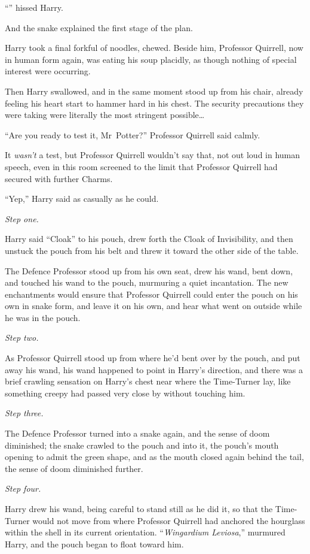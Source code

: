 “” hissed Harry.

And the snake explained the first stage of the plan.

\later

Harry took a final forkful of noodles, chewed. Beside him, Professor Quirrell, now in human form again, was eating his soup placidly, as though nothing of special interest were occurring.

Then Harry swallowed, and in the same moment stood up from his chair, already feeling his heart start to hammer hard in his chest. The security precautions they were taking were literally the most stringent possible…

“Are you ready to test it, Mr~Potter?” Professor Quirrell said calmly.

It \emph{wasn’t} a test, but Professor Quirrell wouldn’t say that, not out loud in human speech, even in this room screened to the limit that Professor Quirrell had secured with further Charms.

“Yep,” Harry said as casually as he could.

\emph{Step one.}

Harry said “Cloak” to his pouch, drew forth the Cloak of Invisibility, and then unstuck the pouch from his belt and threw it toward the other side of the table.

The Defence Professor stood up from his own seat, drew his wand, bent down, and touched his wand to the pouch, murmuring a quiet incantation. The new enchantments would ensure that Professor Quirrell could enter the pouch on his own in snake form, and leave it on his own, and hear what went on outside while he was in the pouch.

\emph{Step two.}

As Professor Quirrell stood up from where he’d bent over by the pouch, and put away his wand, his wand happened to point in Harry’s direction, and there was a brief crawling sensation on Harry’s chest near where the Time-Turner lay, like something creepy had passed very close by without touching him.

\emph{Step three.}

The Defence Professor turned into a snake again, and the sense of doom diminished; the snake crawled to the pouch and into it, the pouch’s mouth opening to admit the green shape, and as the mouth closed again behind the tail, the sense of doom diminished further.

\emph{Step four.}

Harry drew his wand, being careful to stand still as he did it, so that the Time-Turner would not move from where Professor Quirrell had anchored the hourglass within the shell in its current orientation. “\emph{Wingardium Leviosa},” murmured Harry, and the pouch began to float toward him.

